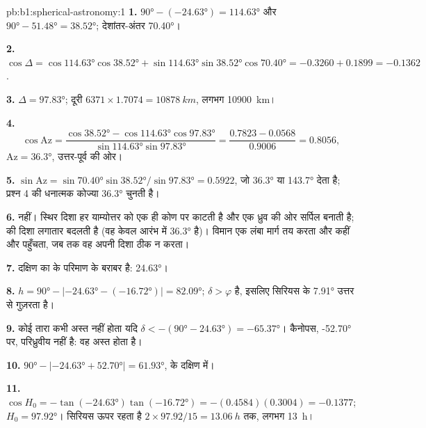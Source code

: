 \begin{solution}{pb:b1:spherical-astronomy:1}
\textbf{1.}  $\ang{90} - (\ang{-24.63}) = \ang{114.63}$ और
$\ang{90} - \ang{51.48} = \ang{38.52}$; देशांतर-अंतर \ang{70.40}।

\textbf{2.} $\cos\Delta = \cos\ang{114.63}\cos\ang{38.52} +
\sin\ang{114.63}\sin\ang{38.52}\cos\ang{70.40} = -0.3260 + 0.1899 =
-0.1362$.

\textbf{3.} $\Delta = \ang{97.83}$; दूरी $6371\times1.7074 =
\qty{10878}{km}$, लगभग \qty{10900}{km}।

\textbf{4.}
\[
  \cos\mathrm{Az} = \frac{\cos\ang{38.52} - \cos\ang{114.63}\cos\ang{97.83}}
  {\sin\ang{114.63}\sin\ang{97.83}} = \frac{0.7823 - 0.0568}{0.9006} = 0.8056 ,
\]
$\mathrm{Az} = \ang{36.3}$, उत्तर-पूर्व की ओर।

\textbf{5.} $\sin\mathrm{Az} = \sin\ang{70.40}\sin\ang{38.52}/\sin\ang{97.83}
= 0.5922$, जो \ang{36.3} या \ang{143.7} देता है; प्रश्न 4 की धनात्मक कोज्या \ang{36.3} चुनती है।

\textbf{6.} नहीं। स्थिर दिशा हर याम्योत्तर को एक ही कोण पर काटती है और एक ध्रुव की ओर सर्पिल
बनाती है;  की दिशा लगातार बदलती है (वह केवल आरंभ में \ang{36.3} है)। विमान एक लंबा
मार्ग तय करता और कहीं और पहुँचता, जब तक वह अपनी दिशा ठीक न करता।

\textbf{7.} दक्षिण  का   के परिमाण के बराबर है: \ang{24.63}।

\textbf{8.} $h = \ang{90} - |\ang{-24.63} - (\ang{-16.72})| = \ang{82.09}$;
$\delta > \varphi$ है, इसलिए सिरियस  के \ang{7.91} उत्तर से गुज़रता है।

\textbf{9.} कोई तारा कभी अस्त नहीं होता यदि $\delta < -(\ang{90} - \ang{24.63}) =
\ang{-65.37}$। कैनोपस, \ang{-52.70} पर, परिध्रुवीय नहीं है: वह अस्त होता है।

\textbf{10.} $\ang{90} - |\ang{-24.63} + \ang{52.70}| = \ang{61.93}$,  के दक्षिण में।

\textbf{11.} $\cos H_0 = -\tan(\ang{-24.63})\tan(\ang{-16.72}) =
-(0.4584)(0.3004) = -0.1377$; $H_0 = \ang{97.92}$। सिरियस ऊपर रहता है
$2\times97.92/15 = \qty{13.06}{h}$  तक, लगभग \qty{13}{h}।


\end{solution}
